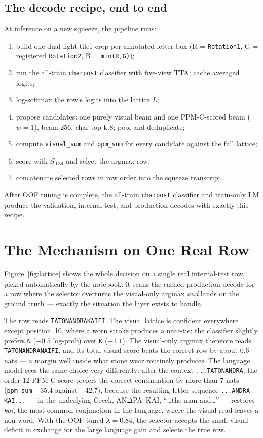 \documentclass[11pt]{article}
\newcommand{\charpost}{\texttt{charpost}}
\begin{document}
\subsection{The decode recipe, end to end}
\label{sec:recipe}
At inference on a new squeeze, the pipeline runs:
\begin{enumerate}
  \item build one dual-light tile1 crop per annotated letter box (R = \texttt{Rotation1},
        G = registered \texttt{Rotation2}, B = \texttt{min(R,G)});
  \item run the all-train \charpost{} classifier with five-view TTA; cache averaged logits;
  \item log-softmax the row's logits into the lattice $L$;
  \item propose candidates: one purely visual beam and one PPM-C-scored beam ($w{=}1$), beam 256,
        char-top-k 8; pool and deduplicate;
  \item compute \texttt{visual\_sum} and \texttt{ppm\_sum} for every candidate against the full lattice;
  \item score with $S_{0.84}$ and select the argmax row;
  \item concatenate selected rows in row order into the squeeze transcript.
\end{enumerate}
After OOF tuning is complete, the all-train \charpost{} classifier and train-only LM produce the
validation, internal-test, and production decodes with exactly this recipe.

\FloatBarrier
\section{The Mechanism on One Real Row}
\label{sec:worked}
Figure~\ref{fig:lattice} shows the whole decision on a single real
internal-test row, picked automatically by the notebook: it scans the cached production decode for
a row where the selector overturns the visual-only argmax \emph{and} lands on the ground truth ---
exactly the situation the layer exists to handle.

The row reads \texttt{TATONANDRAKAIFI}. The visual lattice is confident everywhere except
position~10, where a worn stroke produces a near-tie: the classifier slightly prefers \texttt{N}
($-0.5$ log-prob) over \texttt{K} ($-1.1$). The visual-only argmax therefore reads
\texttt{TATONANDRA\textbf{N}AIFI}, and its total visual score beats the correct row by about
$0.6$ nats --- a margin well inside what stone wear routinely produces. The language model sees
the same choice very differently: after the context \texttt{...TATONANDRA}, the order-12 PPM-C
score prefers the correct continuation by more than $7$ nats
(\texttt{ppm\_sum} $-35.4$ against $-42.7$), because the resulting letter sequence
\texttt{...ANDRA\,KAI...} --- in the underlying Greek, \mbox{AN$\Delta$PA KAI},
``\ldots the man and\ldots'' --- restores \emph{kai}, the most common conjunction in the
language, where the visual read leaves a non-word. With the OOF-tuned $\lambda=0.84$, the selector
accepts the small visual deficit in exchange for the large language gain and selects the true row.
\end{document}
